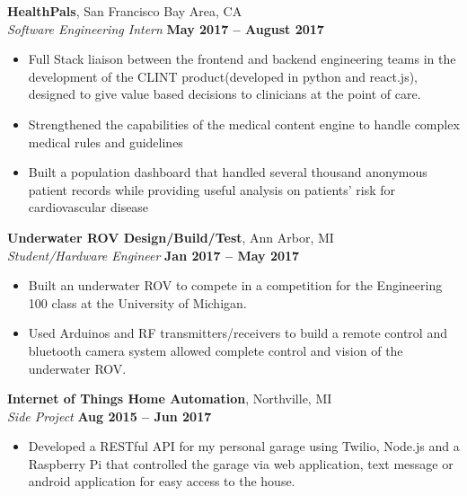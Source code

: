\documentclass[margin,line]{resume}
\begin{document}
\begin{resume}
    \textbf{HealthPals}, San Francisco Bay Area, CA \vspace{2mm}\\\vspace{1mm}%
    \textsl{Software Engineering Intern} \hfill \textbf{May 2017 -- August 2017}
    \begin{itemize}
    \item Full Stack liaison between the frontend and backend engineering teams in the development of the CLINT product(developed in python and react.js), designed to give value based decisions to clinicians at the point of care.
    \item Strengthened the capabilities of the medical content engine to handle complex medical rules and guidelines
    \item Built a population dashboard that handled several thousand anonymous patient records while providing useful analysis on patients' risk for cardiovascular disease
    \end{itemize}



\textbf{Underwater ROV Design/Build/Test}, Ann Arbor, MI \vspace{2mm}\\\vspace{1mm}%
\textsl{Student/Hardware Engineer} \hfill \textbf{Jan 2017 -- May 2017}
\begin{itemize}
	\item Built an underwater ROV to compete in a competition for the Engineering 100 class at the University of Michigan.
	\item Used Arduinos and RF transmitters/receivers to build a remote control and bluetooth camera system allowed complete control and vision of the underwater ROV.
	
\end{itemize}

	\textbf{Internet of Things Home Automation}, Northville, MI \vspace{2mm}\\\vspace{1mm}%
	\textsl{Side Project} \hfill \textbf{Aug 2015 -- Jun 2017}
	\begin{itemize}
		\item Developed a RESTful API for my personal garage using Twilio, Node.js and a Raspberry Pi that controlled the garage via web application, text message or android application for easy access to the house.
	\end{itemize}
 

\end{resume}
\end{document}
